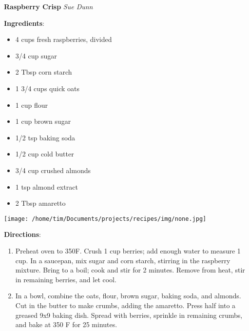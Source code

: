 \documentclass[11pt, twoside, openany]{book}
\begin{document}
\noindent\begin{minipage}[t]{\linewidth}%
{\Large\textbf{Raspberry Crisp}} \label{raspberry-crisp}\hfill\textit{Sue Dunn}\\
\noindent\begin{minipage}[t]{0.78\linewidth}%
\textbf{Ingredients}:\vspace{-3mm}
\begin{multicols}{2}
\begin{itemize}\setlength\itemsep{-1mm}
\item 4 cups fresh raspberries, divided
\item 3/4 cup sugar
\item 2 Tbsp corn starch
\item 1 3/4 cups quick oats
\item 1 cup flour
\item 1 cup brown sugar
\item 1/2 tsp baking soda
\item 1/2 cup cold butter
\item 3/4 cup crushed almonds
\item 1 tsp almond extract
\item 2 Tbsp amaretto
\end{itemize}
\end{multicols}
\end{minipage}
\noindent\begin{minipage}[t]{0.18\linewidth}
\centering \strut\vspace*{-\baselineskip}\newline
\texttt{[image: /home/tim/Documents/projects/recipes/img/none.jpg]}\\
\end{minipage}\vspace{3mm}
\textbf{Directions}:
\vspace{-3mm}\begin{enumerate}\setlength\itemsep{-1mm}
\item Preheat oven to 350F. Crush 1 cup berries; add enough water to measure 1 cup. In a saucepan, mix sugar and corn starch, stirring in the raspberry mixture. Bring to a boil; cook and stir for 2 minutes. Remove from heat, stir in remaining berries, and let cool.
\item In a bowl, combine the oats, flour, brown sugar, baking soda, and almonds. Cut in the butter to make crumbs, adding the amaretto. Press half into a greased 9x9 baking dish. Spread with berries, sprinkle in remaining crumbs, and bake at 350 F for 25 minutes.
\end{enumerate}
\end{minipage}\vspace{8mm}
\end{document}
